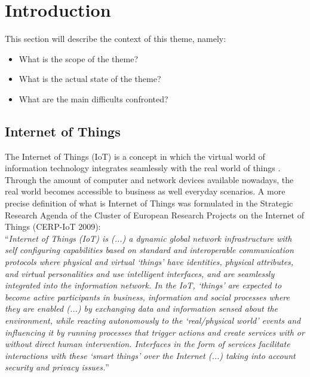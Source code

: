 \section{Introduction}
\label{sec:Introduction}
This section will describe the context of this theme, namely:
\begin{itemize}
  \item What is the scope of the theme?
  \item What is the actual state of the theme?
  \item What are the main difficults confronted?
\end{itemize}
\subsection{Internet of Things}
\label{sub:Internet of Things}
The Internet of Things (IoT) is a concept in which the virtual world of information technology integrates seamlessly
with the real world of things \cite{Uckelmann:2011:AIT:2018904}. Through the amount of computer and network devices
available nowadays, the real world becomes accessible to business as well everyday scenarios. A more precise definition
of what is Internet of Things was formulated in the Strategic Research Agenda of the Cluster of European Research Projects
on the Internet of Things (CERP-IoT 2009):\\

``\textit{Internet of Things (IoT) is (...) a dynamic global network infrastructure with self configuring capabilities based on standard and interoperable
  communication protocols where physical and virtual `things' have identities, physical attributes, and virtual personalities and use intelligent interfaces,
  and are seamlessly integrated into the information network. In the IoT, `things' are expected to become active participants in business, information and social
  processes where they are enabled (...) by exchanging data and information  sensed about the environment, while reacting autonomously to the `real/physical world'
  events and influencing it by running processes that trigger actions and create services with or without direct human intervention. Interfaces in the form of services
  facilitate interactions with these `smart things' over the Internet (...) taking into account security and privacy issues.}''\\

